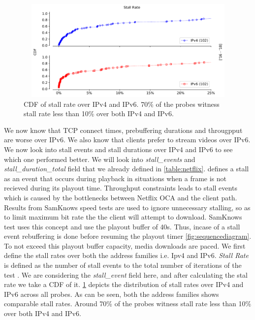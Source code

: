 \begin{figure}[!ht]
	\centering
	\includegraphics[keepaspectratio, height=5cm, width=15cm]{figures/stall/netflix-stall-rate-probes-cdf.pdf}
	\caption[Stall Rate CDF]{CDF of stall rate over IPv4 and IPv6. 70\% of the probes witness stall rate less than 10\% over both IPv4 and IPv6.}
	\label{fig:Stall Rate CDF}
\end{figure}
We now know that TCP connect times, prebuffering durations and througpput are worse over IPv6. We also know that clients prefer to stream videos over IPv6. 
We now look into stall events and stall durations over IPv4 and IPv6 to see which one performed better. We will look into \textit{stall\_events} and \textit{stall\_duration\_total} field that we already defined in \cref{table:netflix}.
\cite{bajpaimeasuring} defines a stall as an event that occurs during playback in situations when a frame is not recieved during its playout time. 
Throughput constraints leads to stall events which is caused by the bottlenecks between Netflix OCA and the client path. Results from SamKnows speed tests \cite{bajpaipam} are used to ignore unnecessary
stalling, so as to limit maximum bit rate the the client will attempt to download. SamKnows test uses this concept and use the playout buffer of 40s. Thus, incase of a stall event
rebuffering is done before resuming the playout timer \cref{fig:sequencediagram}. To not exceed this playout buffer capacity, media downloads are paced. 
We first define the stall rates over both the address families i.e. Ipv4 and IPv6.  \textit{Stall Rate} is defined as the number of stall events to the total number of iterations of the test \cite{bajpaimeasuring}. 
We are considering the \textit{stall\_event} field here, and after calculating the stal rate we take a CDF of it.
\cref{fig:Stall Rate CDF} depicts the distribution of stall rates over IPv4 and IPv6 across all probes. As can be seen, both the address families shows comparable stall rates. Around 70\% of the probes witness stall rate less than 10\% over both IPv4 and IPv6.
